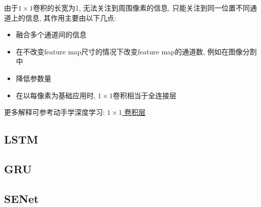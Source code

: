 由于$1\times 1$卷积的长宽为1, 无法关注到周围像素的信息, 只能关注到同一位置不同通道上的信息, 其作用主要由以下几点: 
\begin{itemize}
	\item 融合多个通道间的信息
	\item 在不改变feature map尺寸的情况下改变feature map的通道数, 例如在图像分割中
	\item 降低参数量
	\item 在以每像素为基础应用时, $1\times 1$卷积相当于全连接层
\end{itemize}
更多解释可参考动手学深度学习: \href{https://zh-v2.d2l.ai/chapter_convolutional-neural-networks/channels.html#times-1}{$1\times 1$  卷积层}

\subsection{LSTM}

\subsection{GRU}

\subsection{SENet}
